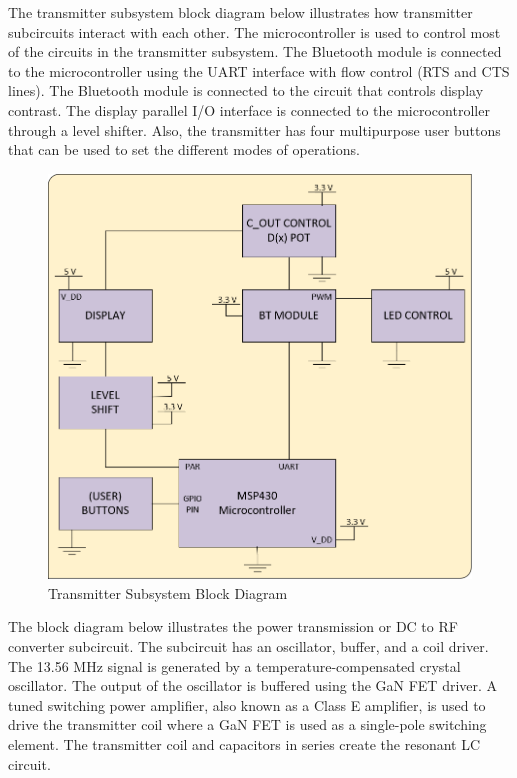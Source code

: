 \documentclass[12pt]{article}
\begin{document}
\pagebreak

\indent
The transmitter subsystem block diagram below illustrates how transmitter subcircuits interact with each other.  The microcontroller is used to control most of the circuits in the transmitter subsystem.  The Bluetooth module is connected to the microcontroller using the UART interface with flow control (RTS and CTS lines). The Bluetooth module is connected to the circuit that controls display contrast. The display parallel I/O interface is connected to the microcontroller through a level shifter. Also, the transmitter has four multipurpose user buttons that can be used to set the different modes of operations. 

\hfill

\begin{figure}[h!]
\centering
\includegraphics[width=0.88\linewidth]{controller_block}
\caption{Transmitter Subsystem Block Diagram}
\end{figure}

\hfill

\pagebreak

\indent
The block diagram below illustrates the power transmission or DC to RF converter subcircuit.  The subcircuit has an oscillator, buffer, and a coil driver.  The 13.56 MHz signal is generated by a temperature-compensated crystal oscillator. The output of the oscillator is buffered using the GaN FET driver. A tuned switching power amplifier, also known as a Class E amplifier, is used to drive the transmitter coil where a GaN FET is used as a single-pole switching element. The transmitter coil and capacitors in series create the resonant LC circuit.\\
\end{document}
